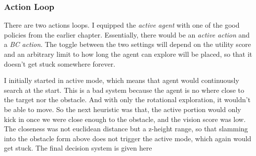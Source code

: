 \subsubsection{Action Loop}
There are two actions loops. I equipped the \emph{active agent} with one of the good policies from the earlier chapter. Essentially, there would be an \emph{active action} and a \emph{BC action}. The toggle between the two settings will depend on the utility score and an arbitrary limit to how long the agent can explore will be placed, so that it doesn't get stuck somewhere forever.

I initially started in active mode, which means that agent would continuously search at the start. This is a bad system because the agent is no where close to the target nor the obstacle. And with only the rotational exploration, it wouldn't be able to move. So the next heuristic was that, the active portion would only kick in once we were close enough to the obstacle, and the vision score was low. The closeness was not euclidean distance but a z-height range, so that slamming into the obstacle form above does not trigger the active mode, which again would get stuck. The final decision system is given here 
  